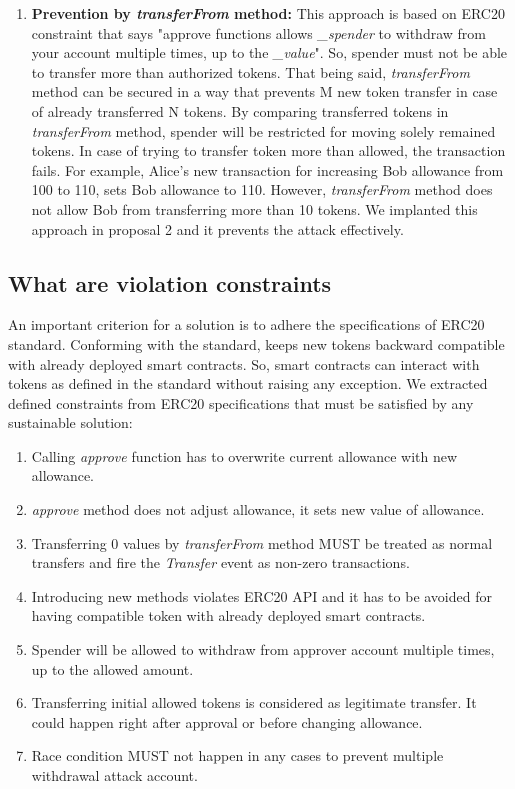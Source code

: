 \begin{enumerate}[label=\Alph*.]
	\item \textbf{Prevention by \textit{transferFrom} method:} This approach is based on ERC20 constraint that says "approve functions allows \textit{\_spender} to withdraw from your account multiple times, up to the \textit{\_value}". So, spender must not be able to transfer more than authorized tokens. That being said, \textit{transferFrom} method can be secured in a way that prevents M new token transfer in case of already transferred N tokens. By comparing transferred tokens in \textit{transferFrom} method, spender will be restricted for moving solely remained tokens. In case of trying to transfer token more than allowed, the transaction fails. For example, Alice's new transaction for increasing Bob allowance from 100 to 110, sets Bob allowance to 110. However, \textit{transferFrom} method does not allow Bob from transferring more than 10 tokens. We implanted this approach in proposal 2 and it prevents the attack effectively.
\end{enumerate}

\subsection{What are violation constraints}
An important criterion for a solution is to adhere the specifications of ERC20 standard. Conforming with the standard, keeps new tokens backward compatible with already deployed smart contracts. So, smart contracts can interact with tokens as defined in the standard without raising any exception. We extracted defined constraints from ERC20 specifications \cite{Ref08} that must be satisfied by any sustainable solution:
\begin{enumerate}
	\item Calling \textit{approve} function has to overwrite current allowance with new allowance.
	\item \textit{approve} method does not adjust allowance, it sets new value of allowance.
	\item Transferring 0 values by \textit{transferFrom} method MUST be treated as normal transfers and fire the \textit{Transfer} event as non-zero transactions.
	\item Introducing new methods violates ERC20 API and it has to be avoided for having compatible token with already deployed smart contracts.
	\item Spender will be allowed to withdraw from approver account multiple times, up to the allowed amount.
	\item Transferring initial allowed tokens is considered as legitimate transfer. It could happen right after approval or before changing allowance.
	\item Race condition MUST not happen in any cases to prevent multiple withdrawal attack account.\newline
\end{enumerate}